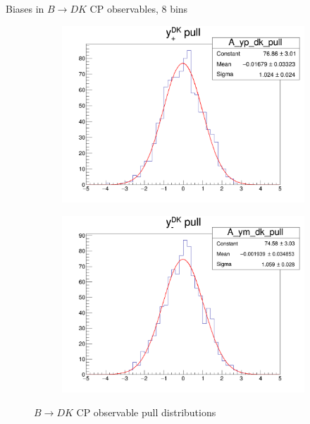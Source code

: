 \documentclass{beamer}
\begin{document}
\begin{frame}{Biases in $B\to DK$ CP observables, $8$ bins}
\begin{figure}
\begin{subfigure}{0.42\textwidth}
      \includegraphics[width = 1.0\textwidth]{A_yp_dk_8Bins_pull.png}
    \end{subfigure}%
    \begin{subfigure}{0.42\textwidth}
      \includegraphics[width = 1.0\textwidth]{A_ym_dk_8Bins_pull.png}
    \end{subfigure}
    \caption{$B\to DK$ CP observable pull distributions}
  \end{figure}
\end{frame}
\end{document}
